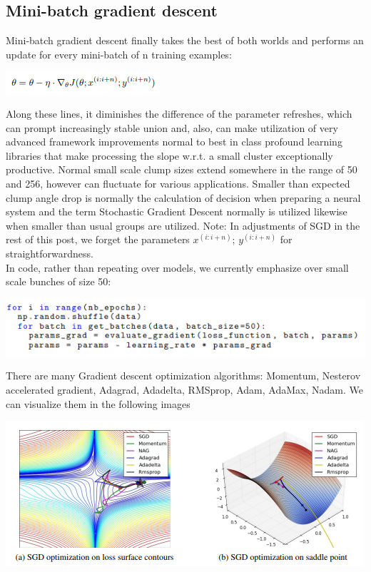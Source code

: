 \documentclass[12pt]{article}
\begin{document}
\subsection*{Mini-batch gradient descent}
\hspace*{10mm}Mini-batch gradient descent finally takes the best of both worlds and performs an update for every mini-batch of n training examples:
\begin{center}
\includegraphics[scale=1]{6}
\end{center}
\hspace*{10mm}Along these lines, it diminishes the difference of the parameter refreshes, which can prompt increasingly stable union and, also, can make utilization of very advanced framework improvements normal to best in class profound learning libraries that make processing the slope w.r.t. a small cluster exceptionally productive. Normal small scale clump sizes extend somewhere in the range of 50 and 256, however can fluctuate for various applications. Smaller than expected clump angle drop is normally the calculation of decision when preparing a neural system and the term Stochastic Gradient Descent normally is utilized likewise when smaller than usual groups are utilized. Note: In adjustments of SGD in the rest of this post, we forget the parameters $x^{(i:i+n)}$; $y^{(i:i+n)}$ for straightforwardness. \\
\hspace*{10mm}In code, rather than repeating over models, we currently emphasize over small scale bunches of size 50:
\begin{center}
\includegraphics[scale=1]{7}
\end{center}
\hspace*{10mm}There are many Gradient descent optimization algorithms: Momentum, Nesterov accelerated gradient, Adagrad, Adadelta, RMSprop, Adam, AdaMax, Nadam. We can visualize them in the following images
\begin{center}
\includegraphics[scale=1]{8}
\end{center}
\end{document}
